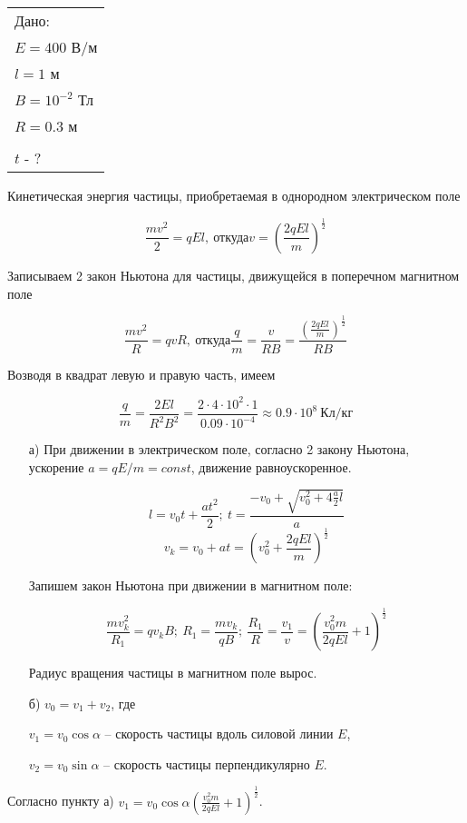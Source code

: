 \solutionSection

\begin{tabular}{l|}
    Дано: \\
    $E = 400$ В/м \\
    $l = 1$ м \\
    $B=10^{-2}$ Тл \\
    $R = 0.3$ м \\
    \hline \\
    $t$ - ?
\end{tabular}

Кинетическая энергия частицы, приобретаемая в однородном электрическом поле
  
$$\frac{mv^2}{2} = qEl, \: \text{откуда} v = \left( \frac{2qEl}{m}\right)^{\frac{1}{2}}$$

Записываем 2 закон Ньютона для частицы, движущейся в поперечном магнитном поле
 
$$\frac{mv^2}{R} = qvR, \: \text{откуда} \frac{q}{m} = \frac{v}{RB} = \frac{\left(\frac{2qEl}{m}\right)^{\frac{1}{2}}}{RB}$$

Возводя в квадрат левую и правую часть, имеем
 
$$\frac{q}{m} = \frac{2El}{R^2B^2} = \frac{2 \cdot 4 \cdot 10^2 \cdot 1}{0.09 \cdot 10^{-4}} \approx 0.9 \cdot 10^8 \: \text{Кл/кг}$$

\begin{enumerate}
    \item[а)] При движении в электрическом поле, согласно 2 закону Ньютона, ускорение $a = qE/m=const$, движение равноускоренное.
 
$$l = v_0 t + \frac{at^2}{2}; \: t = \frac{-v_0 + \sqrt{v_0^2 + 4 \frac{a}{2}l}}{a}$$
$$v_{k} = v_0 +at = \left( v_0^2 + \frac{2qEl}{m}\right)^{\frac{1}{2}}$$

Запишем закон Ньютона при движении в магнитном поле:

$$\frac{mv_k^2}{R_1} = qv_kB; \: R_1 = \frac{mv_k}{qB}; \: \frac{R_1}{R} = \frac{v_1}{v} = \left(\frac{v_0^2m}{2qEl} + 1\right)^{\frac{1}{2}}$$

Радиус вращения частицы в магнитном поле вырос.
\item [б)] $v_0=v_1+v_2$,  где 

$v_1 = v_0 \cos \alpha$ – скорость частицы вдоль силовой линии $E$,

$v_2 = v_0 \sin \alpha$ – скорость частицы перпендикулярно $E$.
\end{enumerate}
Согласно пункту а)  $v_1 = v_0 \cos \alpha \left(\frac{v_0^2m}{2qEl} + 1\right)^{\frac{1}{2}}$.

